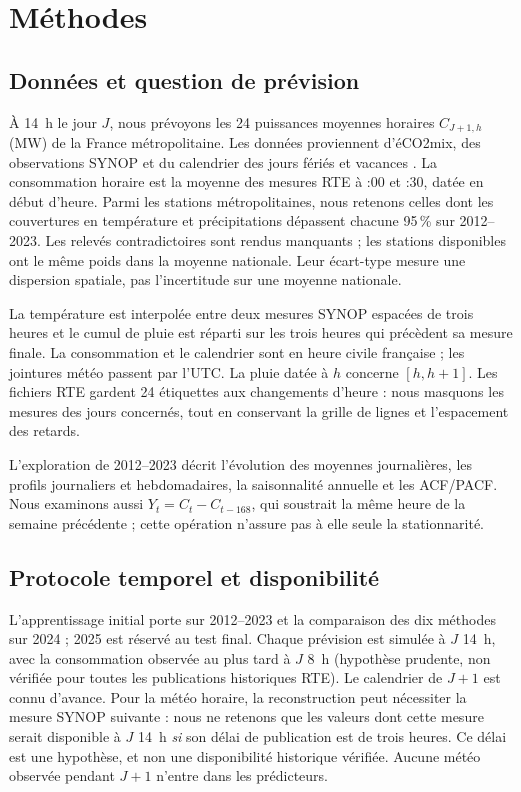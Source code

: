 \section{Méthodes}\label{sec:methodes}

\subsection{Données et question de prévision}
À 14~h le jour $J$, nous prévoyons les 24 puissances moyennes horaires $C_{J+1,h}$ (MW) de la France métropolitaine. Les données proviennent d'éCO2mix, des observations SYNOP et du calendrier des jours fériés et vacances \parencite{rte_eco2mix_2026,meteo_france_synop_2026,gouvernement2026joursferies,augusti2026vacances}. La consommation horaire est la moyenne des mesures RTE à :00 et :30, datée en début d'heure. Parmi les stations métropolitaines, nous retenons celles dont les couvertures en température et précipitations dépassent chacune 95\,\% sur 2012--2023. Les relevés contradictoires sont rendus manquants ; les stations disponibles ont le même poids dans la moyenne nationale. Leur écart-type mesure une dispersion spatiale, pas l'incertitude sur une moyenne nationale.

La température est interpolée entre deux mesures SYNOP espacées de trois heures et le cumul de pluie est réparti sur les trois heures qui précèdent sa mesure finale. La consommation et le calendrier sont en heure civile française ; les jointures météo passent par l'UTC. La pluie datée à $h$ concerne $[h,h+1]$. Les fichiers RTE gardent 24 étiquettes aux changements d'heure : nous masquons les mesures des jours concernés, tout en conservant la grille de lignes et l'espacement des retards.

L'exploration de 2012--2023 décrit l'évolution des moyennes journalières, les profils journaliers et hebdomadaires, la saisonnalité annuelle et les ACF/PACF. Nous examinons aussi $Y_t=C_t-C_{t-168}$, qui soustrait la même heure de la semaine précédente ; cette opération n'assure pas à elle seule la stationnarité.

\subsection{Protocole temporel et disponibilité}
L'apprentissage initial porte sur 2012--2023 et la comparaison des dix méthodes sur 2024 ; 2025 est réservé au test final. Chaque prévision est simulée à $J$ 14~h, avec la consommation observée au plus tard à $J$ 8~h (hypothèse prudente, non vérifiée pour toutes les publications historiques RTE). Le calendrier de $J+1$ est connu d'avance. Pour la météo horaire, la reconstruction peut nécessiter la mesure SYNOP suivante : nous ne retenons que les valeurs dont cette mesure serait disponible à $J$ 14~h \emph{si} son délai de publication est de trois heures. Ce délai est une hypothèse, et non une disponibilité historique vérifiée. Aucune météo observée pendant $J+1$ n'entre dans les prédicteurs.


